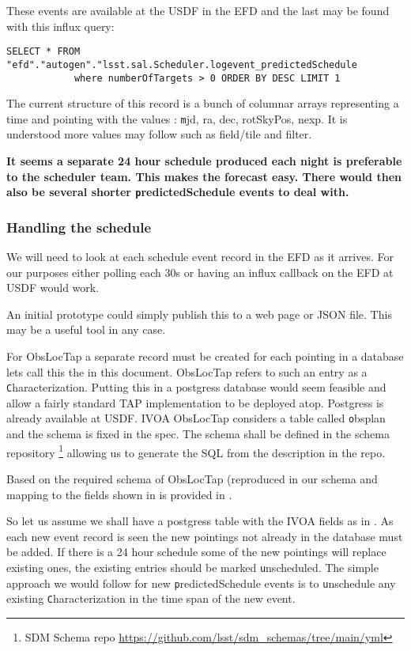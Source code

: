 These events are available at the USDF in the EFD and the last may be found with this influx query:
\begin{lstlisting}
SELECT * FROM "efd"."autogen"."lsst.sal.Scheduler.logevent_predictedSchedule
            where numberOfTargets > 0 ORDER BY DESC LIMIT 1
\end{lstlisting}

The current structure of this record is a bunch of columnar arrays representing a time and pointing with the
values : {\texttt mjd, ra, dec, rotSkyPos, nexp}.
It is understood more values may follow such as field/tile and filter.


{\bf It seems a separate 24 hour schedule produced each night is preferable to the scheduler team. This makes the forecast easy. There would then also be several shorter {\texttt predictedSchedule} events to deal with. }

\subsubsection{Handling the schedule}
We will need to look at each schedule event record in the EFD as it arrives.
For our purposes either polling each 30s or having an influx callback on the EFD at USDF would
work.

An initial prototype could simply publish this to a web page or JSON file.
This may be a useful tool in any case.


For ObsLocTap a separate record must be created for each pointing in a database lets call this the \DB in this document.
ObsLocTap refers to such an entry as a {\texttt Characterization}.
Putting this in a postgress database would seem feasible and allow a fairly standard TAP implementation to be deployed atop.
Postgress is already available at USDF.
IVOA ObsLocTap considers a table called {\texttt obsplan} and the schema is fixed in the spec.
The schema shall be  defined in the schema repository
\footnote{ SDM Schema repo \url{https://github.com/lsst/sdm_schemas/tree/main/yml}}
 allowing us to generate the SQL from the description in the repo.

Based on the required schema of ObsLocTap (reproduced in  our schema and mapping to the fields shown in  is provided in .




So let us assume we shall have a postgress table with the IVOA fields as in .
As each new event record is seen the new pointings not already in the database must be added.
If there is a 24 hour schedule some of the new pointings will replace existing ones, the existing entries should be marked {\texttt unscheduled}.
The simple approach we would follow  for new {\texttt predictedSchedule} events is to {\texttt unschedule} any existing {\texttt Characterization} in the time span of the new event.

